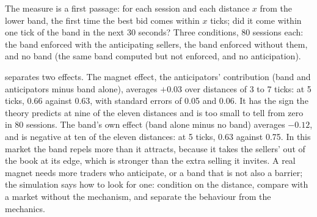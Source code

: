 The measure is a first passage: for each session and each distance $x$ from the lower band, the first time the best bid comes within $x$ ticks; did it
come within one tick of the band in the next 30 seconds? Three conditions, 80 sessions each: the band enforced with the anticipating sellers, the band
enforced without them, and no band (the same band computed but not enforced, and no anticipation).

\begin{omfigure}

\label{fig:mx:circuit-breakers-and-halts:passage}
\end{omfigure}

 separates two effects. The magnet effect, the anticipators' contribution (band and anticipators minus band
alone), averages $+0.03$ over distances of 3 to 7 ticks: at 5 ticks, 0.66 against 0.63, with standard errors of 0.05 and 0.06. It has the sign the
theory predicts at nine of the eleven distances and is too small to tell from zero in 80 sessions. The band's own effect (band alone minus no band)
averages $-0.12$, and is negative at ten of the eleven distances: at 5 ticks, 0.63 against 0.75. In this market the band repels more than it attracts, because it takes the sellers'  out of the book at its edge, which is
stronger than the extra selling it invites. A real magnet needs more traders who anticipate, or a band that is not also a barrier; the simulation says
how to look for one: condition on the distance, compare with a market without the mechanism, and separate the behaviour from the mechanics.

